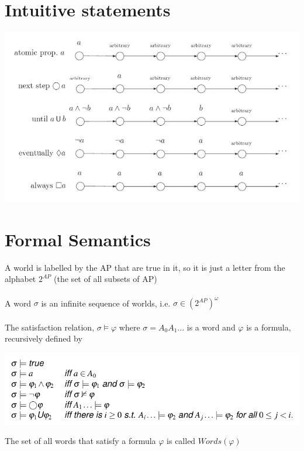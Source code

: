 \documentclass{article}[18pt]
\begin{document}
\section{Intuitive statements}
\begin{center}
	\includegraphics[scale=0.7]{"Intuitive statements"}
\end{center}
\section{Formal Semantics}
A world is labelled by the AP that are true in it, so it is just a letter from the alphabet $2^{AP}$ (the set of all subsets of AP)\\
\\
A word $\sigma$ is an infinite sequence of worlds, i.e. $\sigma \in (2^{AP})^\omega$\\
\\
The satisfaction relation, $\sigma \models \varphi$ where $\sigma = A_0A_1...$ is a word and $\varphi$ is a formula, recursively defined by
\begin{center}
	\includegraphics[scale=0.7]{"Satisfaction Relation"}
\end{center}
The set of all words that satisfy a formula $\varphi$ is called $Words(\varphi)$
\end{document}
